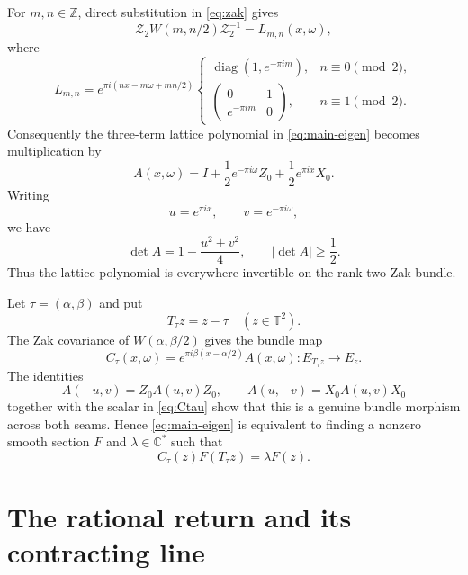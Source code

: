 \documentclass[11pt]{amsart}
\theoremstyle{remark}
\newcommand{\C}{\mathbb C}
\newcommand{\Z}{\mathbb Z}
\newcommand{\T}{\mathbb T}
\newcommand{\cZ}{\mathcal Z_2}
\newcommand{\diag}{\operatorname{diag}}
\begin{document}
For $m,n\in\Z$, direct substitution in \eqref{eq:zak} gives
\begin{equation}\label{eq:Lmn}
 \cZ W(m,n/2)\cZ^{-1}=L_{m,n}(x,\omega),
\end{equation}
where
\begin{equation}\label{eq:Lmn-formula}
 L_{m,n}=e^{\pi i(nx-m\omega+mn/2)}
 \begin{cases}
 \diag(1,e^{-\pi im}),&n\equiv0\pmod2,\\[1mm]
 \begin{pmatrix}0&1\\e^{-\pi im}&0\end{pmatrix},&n\equiv1\pmod2.
 \end{cases}
\end{equation}
Consequently the three-term lattice polynomial in
\eqref{eq:main-eigen} becomes multiplication by
\begin{equation}\label{eq:A}
 A(x,\omega)=I+\frac12e^{-\pi i\omega}Z_0
                +\frac12e^{\pi ix}X_0.
\end{equation}
Writing
\[
 u=e^{\pi ix},\qquad v=e^{-\pi i\omega},
\]
we have
\begin{equation}\label{eq:detA}
 \det A=1-\frac{u^2+v^2}{4},
 \qquad
 |\det A|\ge\frac12.
\end{equation}
Thus the lattice polynomial is everywhere invertible on the rank-two Zak
bundle.

Let $\tau=(\alpha,\beta)$ and put
\[
 T_\tau z=z-\tau\quad(z\in\T^2).
\]
The Zak covariance of $W(\alpha,\beta/2)$ gives the bundle map
\begin{equation}\label{eq:Ctau}
 C_\tau(x,\omega)
 =e^{\pi i\beta(x-\alpha/2)}A(x,\omega):E_{T_\tau z}\longrightarrow E_z.
\end{equation}
The identities
\[
 A(-u,v)=Z_0A(u,v)Z_0,
 \qquad
 A(u,-v)=X_0A(u,v)X_0
\]
together with the scalar in \eqref{eq:Ctau} show that this is a genuine
bundle morphism across both seams.  Hence \eqref{eq:main-eigen} is equivalent
to finding a nonzero smooth section $F$ and $\lambda\in\C^*$ such that
\begin{equation}\label{eq:cocycle-eigen}
 C_\tau(z)F(T_\tau z)=\lambda F(z).
\end{equation}

\section{The rational return and its contracting line}\label{sec:return}
\end{document}
